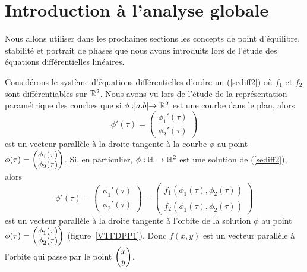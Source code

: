 {\section{Introduction à l'analyse globale}

Nous allons utiliser dans les prochaines sections les concepts de
point d'équilibre, stabilité et portrait de phases que nous avons
introduits lors de l'étude des équations différentielles linéaires.

Considérons le système d'équations différentielles d'ordre un
(\ref{sediff2}) où $f_1$ et $f_2$ sont différentiables sur $\mathbb{R}^2$.
Nous avons vu lors de l'étude de la représentation paramétrique des
courbes que si $\phi:]a.b[\rightarrow \mathbb{R}^2$ est une courbe dans le
plan, alors
\[
\phi'(\tau) = \begin{pmatrix} \phi_1'(\tau) \\ \phi_2'(\tau) \end{pmatrix}
\]
est un vecteur parallèle à la droite tangente à la courbe $\phi$ au point
$\displaystyle \phi(\tau) =
\begin{pmatrix} \phi_1(\tau) \\ \phi_2(\tau) \end{pmatrix}$.  Si, en
particulier, $\phi:\mathbb{R}\rightarrow \mathbb{R}^2$ est une solution de
(\ref{sediff2}), alors
\begin{equation} \label{vectgsed}
\phi'(\tau) =
\begin{pmatrix} \phi_1'(\tau) \\ \phi_2'(\tau) \end{pmatrix}
= \begin{pmatrix}
f_1(\phi_1(\tau), \phi_2(\tau)) \\
f_2(\phi_1(\tau), \phi_2(\tau))
\end{pmatrix}
\end{equation}
est un vecteur parallèle à la droite tangente à l'orbite de la solution
$\phi$ au point $\displaystyle \phi(\tau) =
\begin{pmatrix} \phi_1(\tau) \\ \phi_2(\tau) \end{pmatrix}$
(figure~\ref{VTFDPP1}).  Donc $f(x,y)$ est un vecteur parallèle à
l'orbite qui passe par le point
$\displaystyle \begin{pmatrix} x \\ y \end{pmatrix}$.


}
